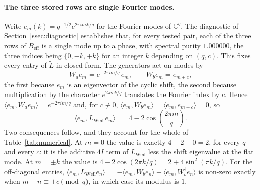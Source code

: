 \documentclass[11pt,a4paper]{article}
\begin{document}
    \paragraph{The three stored rows are single Fourier modes.}
      Write $e_m(k) = q^{-1/2} e^{2\pi i m k/q}$ for the Fourier modes of $\mathbb{C}^q$.
      The diagnostic of Section~\ref{ssec:diagnostic} establishes that, for every tested pair, each
      of the three rows of $B_{\mathrm{eff}}$ is a single mode up to a phase, with spectral purity
      $1.000000$, the three indices being $\{0, -k, +k\}$ for an integer $k$ depending on
      $(q,c)$.
      This fixes every entry of $\tilde L$ in closed form.
      The generators act on modes by
      \begin{equation}
        \label{eq:mode-actions}
        W_a e_m = e^{-2\pi i m/q}\, e_m, \qquad W_b e_m = e_{m+c},
      \end{equation}
      the first because $e_m$ is an eigenvector of the cyclic shift, the second because
      multiplication by the character $e^{2\pi i c k/q}$ translates the Fourier index by $c$.
      Hence $\langle e_m, W_a e_m\rangle = e^{-2\pi i m/q}$ and, for $c \not\equiv 0$,
      $\langle e_m, W_b e_m\rangle = \langle e_m, e_{m+c}\rangle = 0$, so
      \begin{equation}
        \label{eq:rayleigh}
        \langle e_m, L_{\mathrm{Weil}}\, e_m\rangle
        \;=\; 4 - 2\cos\!\left(\frac{2\pi m}{q}\right).
      \end{equation}
      Two consequences follow, and they account for the whole of Table~\ref{tab:numerical}.
      At $m = 0$ the value is exactly $4 - 2 - 0 = 2$, for every $q$ and every $c$: it is the
      additive $4I$ term of $L_{\mathrm{Weil}}$ less the shift eigenvalue at the flat mode.
      At $m = \pm k$ the value is $4 - 2\cos(2\pi k/q) = 2 + 4\sin^2(\pi k/q)$.
      For the off-diagonal entries, $\langle e_m, L_{\mathrm{Weil}} e_n\rangle$
      $= -\langle e_m, W_b e_n\rangle - \langle e_m, W_b^\dagger e_n\rangle$ is non-zero exactly
      when $m - n \equiv \pm c \pmod q$, in which case its modulus is $1$.
\end{document}
